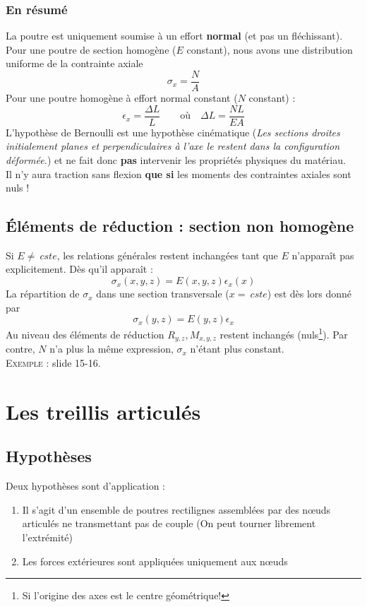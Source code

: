 		\subsubsection{En résumé}
		La poutre est uniquement soumise à un effort \textbf{normal} (et pas 
		un fléchissant). Pour une poutre de section homogène ($E$ constant), 
		nous avons une distribution uniforme de la contrainte axiale 
		\begin{equation}
		\sigma_x = \dfrac{N}{A}
		\end{equation}
		Pour une poutre homogène à effort normal constant ($N$ constant) :
		\begin{equation}
		\epsilon_x = \dfrac{\Delta L}{L}\qquad\text{où}\quad \Delta L = 
		\dfrac{NL}{EA}
		\end{equation}
		L'hypothèse de Bernoulli est une hypothèse cinématique (\textit{Les 
		sections droites initialement planes et perpendiculaires à l'axe le
		restent dans la configuration déformée.}) et ne fait donc \textbf{pas} 
		intervenir les propriétés physiques du matériau.\\
		\danger Il n'y aura traction sans flexion \textbf{que si} les moments 
		des contraintes axiales sont nuls !
		
		
	\subsection{Éléments de réduction : section non homogène}		
	Si $E \neq\ cste$, les relations générales restent inchangées tant que 
	$E$ n'apparaît pas explicitement. Dès qu'il apparaît :
	\begin{equation}
	\sigma_x(x,y,z) = E(x,y,z)\epsilon_x(x)
	\end{equation}
	La répartition de $\sigma_x$ dans une section transversale ($x =\ cste$) 
	est dès lors donné par 
	\begin{equation}
	\sigma_x(y,z) = E(y,z)\epsilon_x
	\end{equation}
	Au niveau des éléments de réduction $R_{y,z}, M_{x,y,z}$ restent inchangés 
	(nuls\footnote{Si l'origine des axes est le centre géométrique!}). Par contre, 
	$N$ n'a plus la même expression, $\sigma_x$ n'étant plus constant.\\
	\textsc{Exemple} : slide 15-16.
	
\section{Les treillis articulés}
	\subsection{Hypothèses}
	Deux hypothèses sont d'application :
	\begin{enumerate}
	\item Il s'agit d'un ensemble de poutres rectilignes assemblées par des 
	nœuds articulés ne transmettant pas de couple (On peut tourner librement 
	l’extrémité)
	\item Les forces extérieures sont appliquées uniquement aux nœuds
	\end{enumerate}
	
